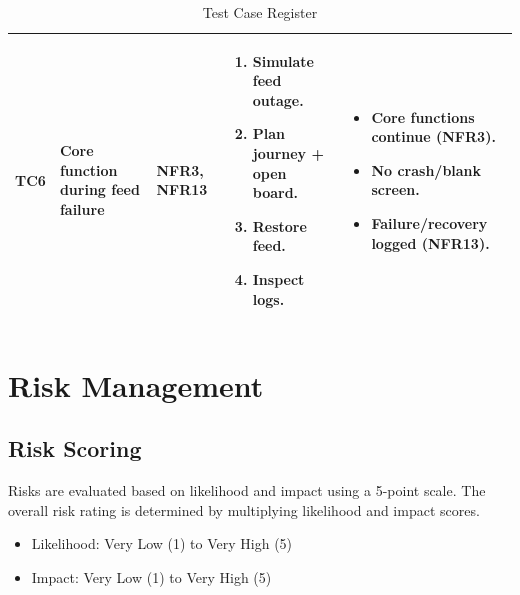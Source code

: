 \documentclass{article}
\begin{document}
\begin{table}[H]
\begin{tabularx}{\textwidth}{|l|X|X|X|X|}
TC6 &
Core function during feed failure &
NFR3, NFR13 &
\begin{enumerate}[nosep,leftmargin=*]
\item Simulate feed outage.
\item Plan journey + open board.
\item Restore feed.
\item Inspect logs.
\end{enumerate}
&
\begin{itemize}[nosep,leftmargin=*]
\item Core functions continue (NFR3).
\item No crash/blank screen.
\item Failure/recovery logged (NFR13).
\end{itemize}
\\
\hline

\end{tabularx}
\caption{Test Case Register}
\end{table}



\newpage


\section{Risk Management}


\subsection{Risk Scoring}
Risks are evaluated based on likelihood and impact using a 5-point scale.
The overall risk rating is determined by multiplying likelihood and impact scores.

\begin{itemize}[itemsep=2pt, topsep=4pt, parsep=0pt]
    \item Likelihood: Very Low (1) to Very High (5)
    \item Impact: Very Low (1) to Very High (5)
\end{itemize}

\end{document}

